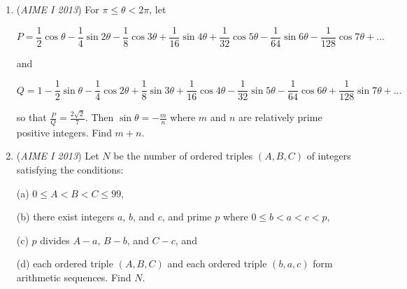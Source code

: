 \begin{enumerate}
 

	\item (\textit{AIME I 2013}) For $\pi \le \theta < 2\pi$, let


 
 \[P=\dfrac12\cos\theta-\dfrac14\sin2\theta-\dfrac18\cos3\theta+\dfrac1{16}\sin4\theta+\dfrac1{32}\cos5\theta-\dfrac1{64}\sin6\theta-\dfrac1{128}\cos7\theta+\ldots\]


 and


 
 \[Q=1-\dfrac12\sin\theta-\dfrac14\cos2\theta+\dfrac1{8}\sin3\theta+\dfrac1{16}\cos4\theta-\dfrac1{32}\sin5\theta-\dfrac1{64}\cos6\theta+\dfrac1{128}\sin7\theta +\ldots\]


 so that $\frac{P}{Q} = \frac{2\sqrt2}{7}$. Then $\sin\theta = -\frac{m}{n}$ where $m$ and $n$ are relatively prime positive integers. Find $m+n$.


 

	\item (\textit{AIME I 2013}) Let $N$ be the number of ordered triples $(A,B,C)$ of integers satisfying the conditions: 


 (a) $0\le A<B<C\le99$, 


 (b) there exist integers $a$, $b$, and $c$, and prime $p$ where $0\le b<a<c<p$, 


 (c) $p$ divides $A-a$, $B-b$, and $C-c$, and 


 (d) each ordered triple $(A,B,C)$ and each ordered triple $(b,a,c)$ form arithmetic sequences. Find $N$.


 

\end{enumerate}